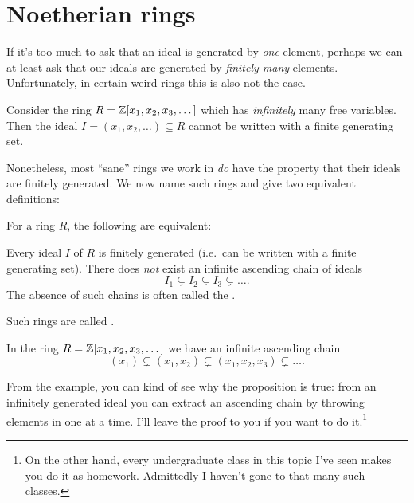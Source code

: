 \section{Noetherian rings}

If it's too much to ask that an ideal is generated by \emph{one} element,
perhaps we can at least ask that our ideals
are generated by \emph{finitely many} elements.
Unfortunately, in certain weird rings this is also not the case.
\begin{example}
	Consider the ring $R = \mathbb Z[x_1, x_2, x_3, \dots]$
	which has \emph{infinitely} many free variables.
	Then the ideal $I = (x_1, x_2, \dots) \subseteq R$
	cannot be written with a finite generating set.
\end{example}
Nonetheless, most ``sane'' rings we work in
\emph{do} have the property that their ideals are finitely generated.
We now name such rings and give two equivalent definitions:
\begin{proposition}
	For a ring $R$, the following are equivalent:
	\begin{enumerate}[(a)]
		\ii Every ideal $I$ of $R$ is finitely generated
		(i.e.\ can be written with a finite generating set).
		\ii There does \emph{not} exist an
		infinite ascending chain of ideals
		\[ I_1 \subsetneq I_2 \subsetneq I_3 \subsetneq \dots. \]
		The absence of such chains is often
		called the .
	\end{enumerate}
	Such rings are called .
\end{proposition}

\begin{example}
	In the ring $R = \mathbb Z[x_1, x_2, x_3, \dots]$ we have
	an infinite ascending chain
	\[ (x_1) \subsetneq (x_1, x_2) \subsetneq (x_1,x_2,x_3) \subsetneq \dots. \]
\end{example}
From the example, you can kind of see why the proposition is true:
from an infinitely generated ideal you can extract an ascending chain
by throwing elements in one at a time.
I'll leave the proof to you if you want to
do it.\footnote{On the other hand, every undergraduate
	class in this topic I've seen makes you do it as homework.
	Admittedly I haven't gone to that many such classes.}

